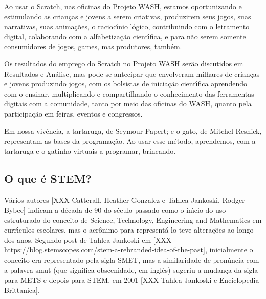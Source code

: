 \documentclass[
12pt,		%
openright,	%
twoside,  %
a4paper,			%
chapter=TITLE,		%
english,			%
french,				%
spanish,			%
brazil				%
]{USPSC-classe/USPSC_RedarTex}
\begin{document}
Ao usar o Scratch, nas oficinas do Projeto WASH, estamos oportunizando e estimulando \textquotedbl as crian\c{c}as e jovens a serem criativas, produzirem seus jogos, suas narrativas, suas anima\c{c}\~oes, o racioc\'{\i}nio l\'ogico, contribuindo com o letramento digital, colaborando com a alfabetiza\c{c}\~ao cient\'{\i}fica, e para n\~ao serem somente consumidores de jogos, games, mas produtores, tamb\'em\textquotedbl .








Os resultados do emprego do Scratch no Projeto WASH ser\~ao discutidos em Resultados e An\'alise, mas pode-se antecipar que envolveram milhares de crian\c{c}as e jovens produzindo jogos, com os bolsistas de inicia\c{c}\~ao cient\'{\i}fica aprendendo com o ensinar, multiplicando e compartilhando o conhecimento das ferramentas digitais  com a comunidade, tanto por meio das oficinas do WASH, quanto pela participa\c{c}\~ao em feiras, eventos e congressos.








Em nossa viv\^encia, a tartaruga, de Seymour Papert; e o gato, de Mitchel Resnick,  representam as bases da  programa\c{c}\~ao. Ao usar esse m\'etodo, aprendemos, com a tartaruga e o gatinho virtuais a  programar,  brincando.








\subsection[O que \'e STEM?]{O que \'e STEM?}\label{O que \'e STEM?}
V\'arios autores [XXX Catterall, Heather Gonzalez e  Tahlea Jankoski, Rodger Bybee] indicam a d\'ecada de 90 do s\'eculo passado como o in\'{\i}cio do uso estruturado do conceito de Science, Technology, Engineering and Mathematics em curr\'{\i}culos escolares, mas o acr\^onimo para represent\'a-lo teve altera\c{c}\~oes ao longo dos anos. Segundo post de Tahlea Jankoski em [XXX https://blog.stemscopes.com/stem-a-rebranded-idea-of-the-past], inicialmente o conceito era representado pela sigla SMET, mas a similaridade de pron\'uncia com a palavra \textquotedbl smut (que significa obscenidade, em ingl\^es) sugeriu a mudan\c{c}a da sigla para METS e depois para STEM, em 2001 [XXX Tahlea Jankoski e Enciclopedia Brittanica]. 
\end{document}
